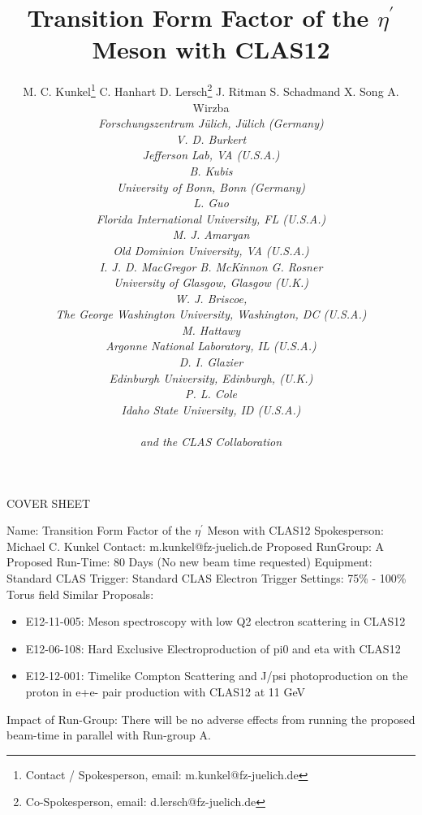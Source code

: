 \documentclass[11pt,a4paper]{article}
\title{Transition Form Factor of the $\eta^{\prime}$ Meson with CLAS12}
\date{}
\author{M. C. Kunkel\thanks{Contact / Spokesperson, email: m.kunkel@fz-juelich.de} \qquad C. Hanhart \qquad D. Lersch\thanks{Co-Spokesperson, email: d.lersch@fz-juelich.de} \qquad J. Ritman \qquad \hspace{2.2cm} S. Schadmand \qquad X. Song \qquad A. Wirzba \\ \vspace{-0.3cm} \it Forschungszentrum J\"ulich, J\"ulich (Germany) \\ \vspace{0.3cm} V. D. Burkert \\ \it Jefferson Lab, VA (U.S.A.)  \\ \vspace{0.3cm} B. Kubis \\ \it University of Bonn, Bonn (Germany) \\ \vspace{0.3cm} L. Guo \\ \it Florida International University, FL (U.S.A.) \\ \vspace{0.3cm} M. J. Amaryan \\ \it Old Dominion University, VA (U.S.A.) \\ \vspace{0.3cm} I. J. D. MacGregor \qquad B. McKinnon \qquad G. Rosner \\ \it University of Glasgow, Glasgow (U.K.) \\ \vspace{0.3cm} W. J. Briscoe,  \\ \it The George Washington University, Washington, DC (U.S.A.) \\ \vspace{0.3cm} M. Hattawy \\ \it Argonne National Laboratory, IL  (U.S.A.) \\ \vspace{0.3cm} D. I. Glazier \\ \it Edinburgh University, Edinburgh, (U.K.) \\ \vspace{0.3cm} P. L. Cole \\ \it Idaho State University, ID (U.S.A.) \\ \  \\ \it \white{space space} and the CLAS Collaboration \newline \newline}
\begin{document}
\begin{titlepage}
		\begin{center}
			\LARGE{COVER SHEET} 		\newline \newline
		\end{center}

     \begin{flushleft}
			Name: Transition Form Factor of the $\eta^{\prime}$ Meson with CLAS12 \newline \newline
			Spokesperson: Michael C. Kunkel \newline \newline
			Contact: m.kunkel@fz-juelich.de \newline \newline
			Proposed RunGroup: A \newline \newline
			Proposed Run-Time: 80 Days (No new beam time requested)\newline \newline
			Equipment: Standard CLAS \newline \newline
			Trigger: Standard CLAS Electron Trigger \newline \newline
			Settings: 75\% - 100\% Torus field \newline \newline
			Similar Proposals: 
			\begin{itemize}
				\item E12-11-005: Meson spectroscopy with low Q2 electron scattering in CLAS12 
				\item E12-06-108: Hard Exclusive Electroproduction of pi0 and eta with CLAS12
				\item E12-12-001: Timelike Compton Scattering and J/psi photoproduction on the proton in e+e- pair production with CLAS12 at 11 GeV
			\end{itemize}
			Impact of Run-Group: There will be no adverse effects from running the proposed beam-time in parallel with Run-group A.
		\end{flushleft}
	\end{titlepage}
\maketitle
\thispagestyle{firststyle}
\end{document}
